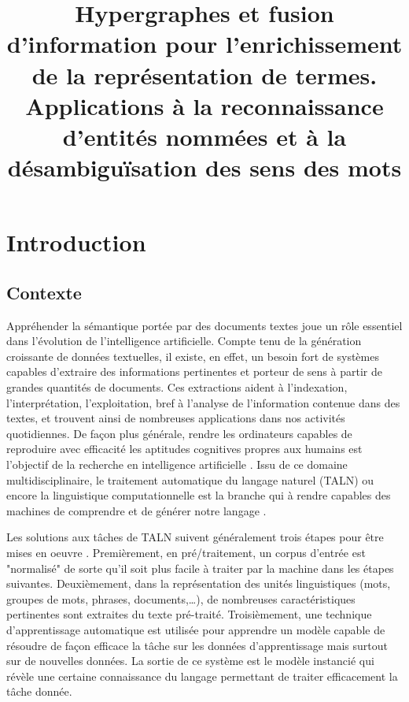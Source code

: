 \documentclass[a4paper,11pt,twoside]{article}
\title{Hypergraphes et fusion d'information pour l'enrichissement de la représentation de termes. Applications à la reconnaissance d'entités nommées et à la désambiguïsation des sens des mots}
\date{}
\begin{document}
\maketitle
\section{Introduction}
\subsection{Contexte}


Appréhender la sémantique portée par des documents textes joue un rôle essentiel dans l'évolution de l'intelligence artificielle. Compte tenu de la génération croissante de données textuelles, il existe, en effet, un besoin fort de systèmes capables d'extraire des informations pertinentes et porteur de sens à partir de grandes quantités de documents. Ces extractions aident à l'indexation, l'interprétation, l'exploitation, bref à l'analyse de l'information contenue dans des textes, et trouvent ainsi de nombreuses applications dans nos activités quotidiennes.
%
De façon plus générale, rendre les ordinateurs capables de reproduire avec efficacité les aptitudes cognitives propres aux humains est l'objectif de la recherche en intelligence artificielle \cite{Sugiyama2015}. Issu de ce domaine multidisciplinaire, le traitement automatique du langage naturel (TALN) ou encore la linguistique computationnelle est la branche qui à rendre capables des machines de comprendre et de générer notre langage \cite{JurafskyM09}.

Les solutions aux tâches de TALN suivent généralement trois étapes pour être mises en oeuvre \cite{JurafskyM09,mining12Book}. Premièrement, en pré\-/traitement, un corpus d'entrée est "normalisé" de sorte qu'il soit plus facile à traiter par la machine dans les étapes suivantes. Deuxièmement, dans la représentation des unités linguistiques (mots, groupes de mots, phrases, documents,\ldots), de nombreuses caractéristiques pertinentes sont extraites du texte pré-traité. Troisièmement, une technique d'apprentissage automatique est utilisée pour apprendre un modèle capable de résoudre de façon efficace la tâche sur les données d'apprentissage mais surtout sur de nouvelles données. La sortie de ce système est le modèle instancié qui révèle une certaine connaissance du langage permettant de traiter efficacement la tâche donnée.
\end{document}

